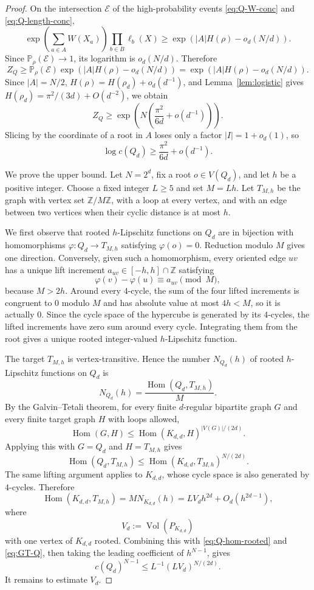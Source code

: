 \documentclass[10pt,a4paper]{amsart}
\DeclareMathOperator{\Hom}{Hom}
\DeclareMathOperator{\Vol}{Vol}
\newcommand{\PP}{\mathbb{P}}
\newcommand{\ZZ}{\mathbb{Z}}
\newcommand{\calE}{\mathcal{E}}
\begin{document}
\begin{proof}
\bigskip
\noindent
On the intersection $\calE$ of the high-probability events \eqref{eq:Q-W-conc} and \eqref{eq:Q-length-conc},
\[
  \exp\left(\sum_{a\in A}W(X_a)\right)
  \prod_{b\in B}\ell_b(X)
  \ge
  \exp\left(|A|H(\rho)-o_d(N/d)\right).
\]
Since $\PP_\rho(\calE)\to1$, its logarithm is $o_d(N/d)$.  Therefore
\[
  Z_Q\ge \PP_\rho(\calE)\exp\left(|A|H(\rho)-o_d(N/d)\right)
  =\exp\left(|A|H(\rho)-o_d(N/d)\right).
\]
Since $|A|=N/2$, $H(\rho)=H(\rho_d)+o_d(d^{-1})$, and Lemma~\ref{lem:logistic} gives $H(\rho_d)=\pi^2/(3d)+O(d^{-2})$, we obtain
\[
  Z_Q\ge \exp\left(N\left(\frac{\pi^2}{6d}+o(d^{-1})\right)\right).
\]
Slicing by the coordinate of a root in $A$ loses only a factor $|I|=1+o_d(1)$, so
\[
  \log c(Q_d)\ge\frac{\pi^2}{6d}+o(d^{-1}).
\]

\bigskip
\noindent
We prove the upper bound.  Let $N=2^d$, fix a root $o\in V(Q_d)$, and let $h$ be a positive integer.  Choose a fixed integer $L\ge5$ and set $M=Lh$.  Let $T_{M,h}$ be the graph with vertex set $\ZZ/M\ZZ$, with a loop at every vertex, and with an edge between two vertices when their cyclic distance is at most $h$.

\bigskip
\noindent
We first observe that rooted $h$-Lipschitz functions on $Q_d$ are in bijection with homomorphisms $\varphi:Q_d\to T_{M,h}$ satisfying $\varphi(o)=0$.  Reduction modulo $M$ gives one direction.  Conversely, given such a homomorphism, every oriented edge $uv$ has a unique lift increment $a_{uv}\in[-h,h]\cap\ZZ$ satisfying
\[
  \varphi(v)-\varphi(u)\equiv a_{uv}\pmod M,
\]
because $M>2h$.  Around every $4$-cycle, the sum of the four lifted increments is congruent to $0$ modulo $M$ and has absolute value at most $4h<M$, so it is actually $0$.  Since the cycle space of the hypercube is generated by its $4$-cycles, the lifted increments have zero sum around every cycle.  Integrating them from the root gives a unique rooted integer-valued $h$-Lipschitz function.

\bigskip
\noindent
The target $T_{M,h}$ is vertex-transitive.  Hence the number $N_{Q_d}(h)$ of rooted $h$-Lipschitz functions on $Q_d$ is
\begin{equation}\label{eq:Q-hom-rooted}
  N_{Q_d}(h)=\frac{\Hom(Q_d,T_{M,h})}{M}.
\end{equation}
By the Galvin--Tetali theorem, for every finite $d$-regular bipartite graph $G$ and every finite target graph $H$ with loops allowed,
\[
  \Hom(G,H)\le \Hom(K_{d,d},H)^{|V(G)|/(2d)}.
\]
Applying this with $G=Q_d$ and $H=T_{M,h}$ gives
\begin{equation}\label{eq:GT-Q}
  \Hom(Q_d,T_{M,h})
  \le \Hom(K_{d,d},T_{M,h})^{N/(2d)}.
\end{equation}
The same lifting argument applies to $K_{d,d}$, whose cycle space is also generated by $4$-cycles.  Therefore
\[
  \Hom(K_{d,d},T_{M,h})=M N_{K_{d,d}}(h)
  =L V_d h^{2d}+O_d(h^{2d-1}),
\]
where
\[
  V_d:=\Vol(P_{K_{d,d}})
\]
with one vertex of $K_{d,d}$ rooted.  Combining this with \eqref{eq:Q-hom-rooted} and \eqref{eq:GT-Q}, then taking the leading coefficient of $h^{N-1}$, gives
\begin{equation}\label{eq:Q-coeff-bound}
  c(Q_d)^{N-1}
  \le L^{-1}(L V_d)^{N/(2d)}.
\end{equation}
It remains to estimate $V_d$.


\end{proof}
\end{document}
